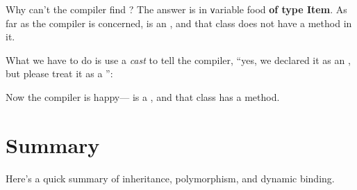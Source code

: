 Why can't the compiler find ? The answer is in {\texttt variable food {\bf of type Item}}. As far as the compiler is concerned,  is an , and that class does not have a  method in it.

What we have to do is use a {\em cast} to tell the compiler, ``yes, we declared it as an , but please treat it as a '':


Now the compiler is happy--- is a , and that class has a  method.

\section{Summary}


Here's a quick summary of inheritance, polymorphism, and dynamic binding.


